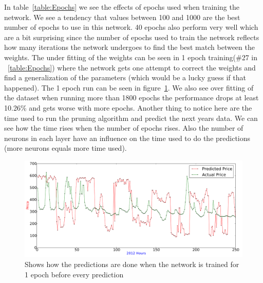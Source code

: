 In table~\ref{table:Epochs} we see the effects of epochs used when training the network. We see a tendency that values between 100 and 1000 are the best number of epochs to use in this network. 40 epochs also perform very well which are a bit surprising since the number of epochs used to train the network reflects how many iterations the network undergoes to find the best match between the weights. The under fitting of the weights can be seen in 1 epoch training(\#27 in ~\ref{table:Epochs}) where the network gets one attempt to correct the weights and find a generalization of the parameters (which would be a lucky guess if that happened). The 1 epoch run can be seen in figure~\ref{fig:1epoch}. We also see over fitting of the dataset when running more than 1800 epochs the performance drops at least 10.26\% and gets worse with more epochs. Another thing to notice here are the time used to run the pruning algorithm and predict the next years data. We can see how the time rises when the number of epochs rises. Also the number of neurons in each layer have an influence on the time used to do the predictions (more neurons equals more time used).


\begin{figure}[H]
\centering
\includegraphics[width=\linewidth]{billeder/PriceExperimentalAnalysis/1EpochTraining.png}
\caption{Shows how the predictions are done when the network is trained for 1 epoch before every prediction}
\label{fig:1epoch}
\end{figure}

